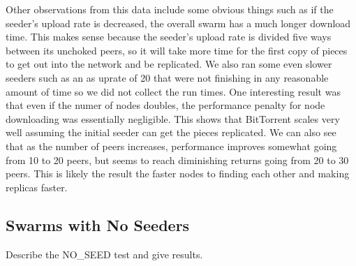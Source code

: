 Other observations from this data include some obvious things such as
if the seeder's upload rate is decreased, the overall swarm has a much
longer download time. This makes sense because the seeder's upload rate
is divided five ways between its unchoked peers, so it will take more
time for the first copy of pieces to get out into the network and be
replicated. We also ran some even slower seeders such as an as uprate
of 20 that were not finishing in any reasonable amount of time so we
did not collect the run times. One interesting result was that even if
the numer of nodes doubles, the performance penalty for node downloading
was essentially negligible. This shows that BitTorrent scales very well
assuming the initial seeder can get the pieces replicated.  We can also
see that as the number of peers increases, performance improves somewhat
going from 10 to 20 peers, but seems to reach diminishing returns going
from 20 to 30 peers. This is likely the result the faster nodes to
finding each other and making replicas faster.



\subsection{Swarms with No Seeders}

Describe the NO\_SEED test and give results.
